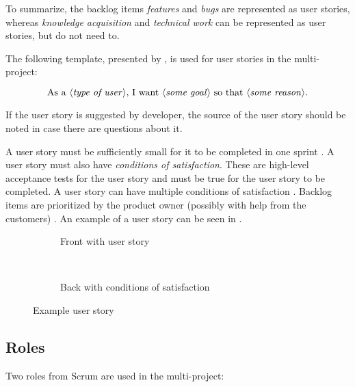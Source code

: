 To summarize, the backlog items \emph{features} and \emph{bugs} are represented as user stories, whereas \emph{knowledge acquisition} and \emph{technical work} can be represented as user stories, but do not need to.

The following template, presented by \textcite{cohn2009}, is used for user stories in the multi-project:

$$\text{As a $\langle{}$\emph{type of user}$\rangle{}$, I want $\langle{}$\emph{some goal}$\rangle{}$ so that $\langle{}$\emph{some reason}$\rangle{}$}.$$

If the user story is suggested by developer, the source of the user story should be noted in case there are questions about it.

A user story must be sufficiently small for it to be completed in one sprint \parencite{cohn2009}. A user story must also have \emph{conditions of satisfaction}. These are high-level acceptance tests for the user story and must be true for the user story to be completed. A user story can have multiple conditions of satisfaction \cite{cohn2009}. Backlog items are prioritized by the product owner (possibly with help from the customers) \cite{larman2003}. An example of a user story can be seen in . 

\begin{figure}
  \centering
  \begin{subfigure}[t]{0.47\textwidth}
    \centering
    \caption{Front with user story}
  \end{subfigure}
  ~~~~~~
  \begin{subfigure}[t]{0.47\textwidth}
    \centering
    \caption{Back with conditions of satisfaction}
  \end{subfigure}
  \caption{Example user story}\label{fig:user_story_ex}
\end{figure}

\subsection{Roles}
Two roles from Scrum are used in the multi-project:

